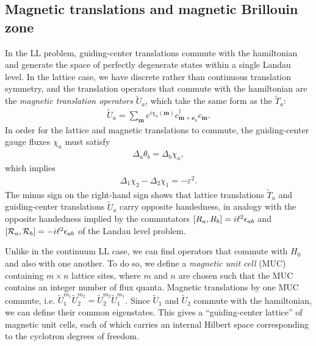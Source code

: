 \documentclass[aps,prb,twocolumn,letterpaper,twoside,nobalancelastpage,groupedaddress,amsmath,amssymb,floatfix,citeautoscript]{revtex4-1}
\begin{document}
\subsection{Magnetic translations and magnetic Brillouin zone}
In the LL problem, guiding-center translations commute with the hamiltonian and generate the space of perfectly degenerate states within a single Landau level. In the lattice case, we have discrete rather than continuous translation symmetry, and the translation operators that commute with the hamiltonian are the \textit{magnetic translation operators} $\widetilde{U}_a$, which take the same form as the $\widetilde{T}_a$:
\begin{align*}
\widetilde{U}_a = \sum_{\mathbf{m}} e^{i\chi_a(\mathbf{m})} c^{\dag}_{\mathbf{m} + \mathbf{e}_a}c_{\mathbf{m}}.
\end{align*}
In order for the lattice and magnetic translations to commute, the guiding-center gauge fluxes $\chi_a$ must satisfy
\begin{align*}
\Delta_a \theta_b = \Delta_b\chi_a,
\end{align*}
which implies
\begin{align*}
\Delta_1\chi_2 - \Delta_2 \chi_1 = -\varepsilon^2.
\end{align*}
The minus sign on the right-hand sign shows that lattice translations $\widetilde{T}_a$ and guiding-center translations $\widetilde{U}_a$ carry opposite handedness, in analogy with the opposite handedness implied by the commutators $\comm{R_a}{R_b} = i\ell^2 \epsilon_{ab}$ and $\comm{\mathcal{R}_a}{\mathcal{R}_b} = -i\ell^2 \epsilon_{ab}$ of the Landau level problem.

Unlike in the continuum LL case, we can find operators that commute with $H_0$ and also with one another. To do so, we define a \textit{magnetic unit cell} (MUC) containing $m \times n$ lattice sites, where $m$ and $n$ are chosen such that the MUC contains an integer number of flux quanta. Magnetic translations by one MUC commute, i.e. $\widetilde{U}_1^{m_1}\widetilde{U}_2^{m_2} = \widetilde{U}_2^{m_2}\widetilde{U}_1^{m_1}$. Since $\widetilde{U}_1$ and $\widetilde{U}_2$ commute with the hamiltonian, we can define their common eigenstates. This gives a ``guiding-center lattice'' of magnetic unit cells, each of which carries an internal Hilbert space corresponding to the cyclotron degrees of freedom.
\end{document}
